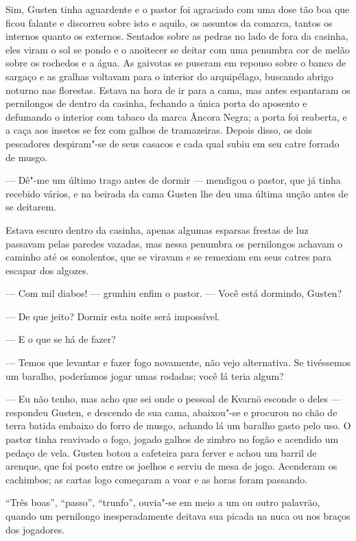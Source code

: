 Sim, Gusten tinha aguardente e o pastor foi agraciado com uma dose tão boa que
ficou falante e discorreu sobre isto e aquilo, os assuntos da
comarca, tantos os internos quanto os externos. Sentados sobre as pedras no lado de
fora da casinha, eles viram o sol se pondo e o anoitecer se deitar com uma
penumbra cor de melão sobre os rochedos e a água. As gaivotas se puseram em
repouso sobre o banco de sargaço e as gralhas voltavam para o interior do
arquipélago, buscando abrigo noturno nas florestas. Estava na hora de ir para a
cama, mas antes espantaram os pernilongos de dentro da casinha, fechando a única
porta do aposento e defumando o interior com tabaco da marca Âncora Negra;
a porta foi reaberta, e a caça aos insetos se fez com galhos de tramazeiras.
Depois disso, os dois pescadores despiram"-se de seus casacos e cada qual subiu 
em seu catre forrado de musgo.

--- Dê"-me um último trago antes de dormir --- mendigou o pastor, que já tinha recebido
vários, e na beirada da cama Gusten lhe deu uma última unção antes de se deitarem.

Estava escuro dentro da casinha, apenas algumas esparsas frestas de luz
passavam pelas paredes vazadas, mas nessa penumbra os pernilongos achavam o
caminho até os sonolentos, que se viravam e se remexiam em seus catres para
escapar dos algozes.

--- Com mil diabos! --- grunhiu enfim o pastor. --- Você está dormindo, Gusten?

--- De que jeito? Dormir esta noite será impossível.

--- E o que se há de fazer?

--- Temos que levantar e fazer fogo novamente, não vejo alternativa. Se
tivéssemos um baralho, poderíamos jogar umas rodadas; você lá teria algum?

--- Eu não tenho, mas acho que sei onde o pessoal de Kvarnö esconde o deles ---
respondeu Gusten, e descendo de sua cama, abaixou"-se e procurou no chão de
terra batida embaixo do forro de musgo, achando lá um baralho gasto pelo uso. O
pastor tinha reavivado o fogo, jogado galhos de zimbro no fogão e acendido um
pedaço de vela. Gusten botou a cafeteira para ferver e achou um barril de
arenque, que foi posto entre os joelhos e serviu de mesa de jogo. Acenderam os
cachimbos; as cartas logo começaram a voar e as horas foram passando.

``Três boas'', ``passo'', ``trunfo'', ouvia"-se em meio a um ou outro palavrão,
quando um pernilongo inesperadamente deitava sua picada na nuca ou nos
braços dos jogadores.

